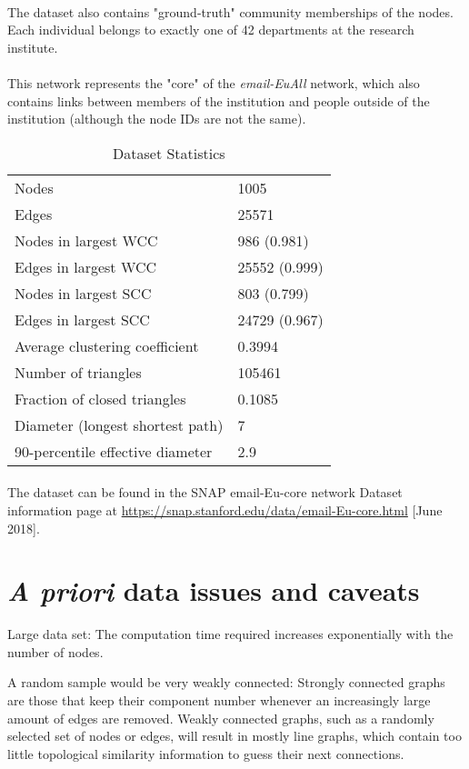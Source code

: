 \documentclass[12pt,a4paper]{report}
\begin{document}
\paragraph{} The dataset also contains "ground-truth" community memberships of the nodes. Each individual belongs to exactly one of 42 departments at the research institute.

\paragraph{} This network represents the "core" of the \emph{email-EuAll} network, which also contains links between members of the institution and people outside of the institution (although the node IDs are not the same). 

\begin{table}[h]
\centering
\caption{Dataset Statistics} 
\label{datasetProperties}
\begin{tabular}{@{}ll@{}}
Nodes & 1005 \\
Edges & 25571 \\
Nodes in largest WCC & 986 (0.981) \\
Edges in largest WCC & 25552 (0.999) \\
Nodes in largest SCC & 803 (0.799) \\
Edges in largest SCC & 24729 (0.967) \\
Average clustering coefficient & 0.3994 \\
Number of triangles & 105461 \\
Fraction of closed triangles & 0.1085 \\
Diameter (longest shortest path) & 7 \\
90-percentile effective diameter & 2.9
\end{tabular}
\end{table}

\paragraph{} The dataset can be found in the SNAP email-Eu-core network Dataset information page at \url{https://snap.stanford.edu/data/email-Eu-core.html} [June 2018].

\section{\emph{A priori} data issues and caveats} \begin{list}{•}{}
\item Large data set: The computation time required increases exponentially with the number of nodes.
\item A random sample would be very weakly connected: Strongly connected graphs are those that keep their component number whenever an increasingly large amount of edges are removed. Weakly connected graphs, such as a randomly selected set of nodes or edges, will result in mostly line graphs, which contain too little topological similarity information to guess their next connections.


\end{list}
\end{document}
